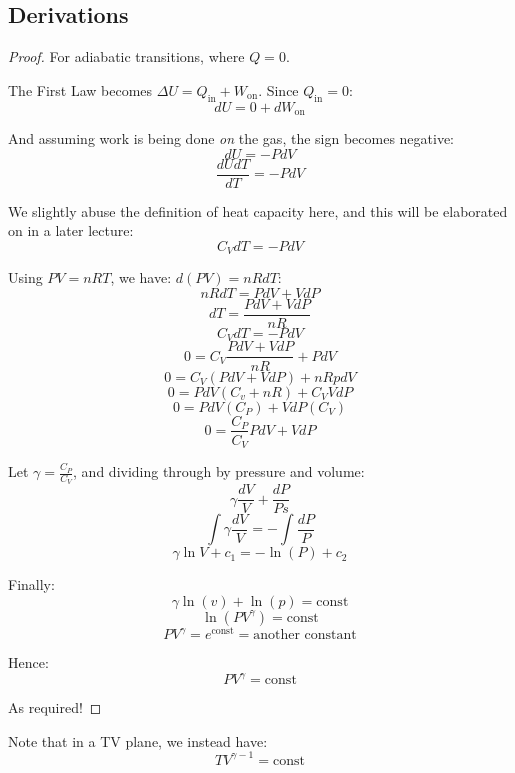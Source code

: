 \subsection{Derivations}
\begin{proof}
    For adiabatic transitions, where $Q = 0$.

    The First Law becomes $\Delta U = Q_\text{in} + W_\text{on}$. Since $Q_\text{in} = 0$:
    \[
        dU = 0 + dW_\text{on}
    \]

    And assuming work is being done \emph{on} the gas, the sign becomes negative:
    \[
        dU = -P dV
    \]
    \[
        \frac{dU dT}{dT} = -P dV
    \]

    We slightly abuse the definition of heat capacity here, and this will be elaborated on in a later lecture:
    \[
        C_V dT = -P dV
    \]
    
    Using $PV = nRT$, we have: $d(PV) = nR dT$:
    \[
        nR dT = P dV + V dP
    \]
    \[
        dT = \frac{P dV + V dP}{nR}
    \]
    \[
        C_V dT = - PdV
    \]
    \[
        0 = C_V \frac{P dV + V dP}{nR} + PdV
    \]
    \[
        0 = C_V \left(P dV + V dP\right) + nR pdV
    \]
    \[
        0 = P dV \left(C_v + nR\right) + C_V V dP
    \]
    \[
        0 = P dV (C_P) + V dP (C_V)  
    \]
    \[
        0 = \frac{C_P}{C_V} PdV + V dP
    \]

    Let $\gamma = \frac{C_P}{C_V}$, and dividing through by pressure and volume:
    \[
        \gamma \frac{dV}{V} + \frac{dP}{Ps}
    \]
    \[
        \int \gamma \frac{dV}{V} = - \int \frac{dP}{P}
    \]
    \[
        \gamma \ln V + c_1 = - \ln(P) + c_2
    \]
    
    Finally:
    \[
        \gamma \ln(v) + \ln(p) = \text{const}
    \]
    \[
        \ln(P V^\gamma) = \text{const}
    \]
    \[
        PV^\gamma = e^\text{const} = \text{another constant}
    \]

    Hence:
    \[
        PV^\gamma = \text{const}
    \]
    
    As required!
\end{proof}

Note that in a TV plane, we instead have:
\[
    TV^{\gamma -1} = \text{const}
\]
